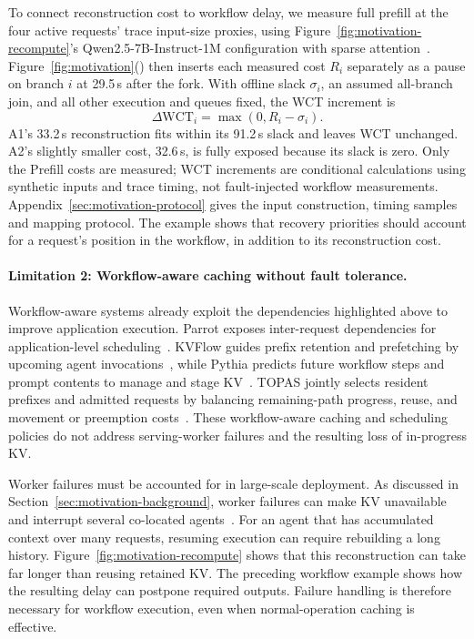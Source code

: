 To connect reconstruction cost to workflow delay, we measure full
prefill at the four active requests' trace input-size proxies, using
Figure~\ref{fig:motivation-recompute}'s Qwen2.5-7B-Instruct-1M
configuration with sparse attention~\cite{qwen2025qwen25oneM,jiang2024minference}.
Figure~\ref{fig:motivation}()
then inserts each measured cost $R_i$ separately as a pause on branch
$i$ at 29.5\,s after the fork. With offline slack $\sigma_i$, an assumed
all-branch join, and all other execution and queues fixed, the WCT
increment is
\[
  \Delta\mathrm{WCT}_i=\max(0,R_i-\sigma_i).
\]
A1's 33.2\,s reconstruction fits within its 91.2\,s slack and leaves WCT
unchanged. A2's slightly smaller cost, 32.6\,s, is fully exposed because
its slack is zero.
Only the Prefill costs are measured; WCT increments are conditional
calculations using synthetic inputs and trace timing, not fault-injected
workflow measurements. Appendix~\ref{sec:motivation-protocol} gives the
input construction, timing samples and mapping protocol.
The example shows that recovery priorities should account for a request's
position in the workflow, in addition to its reconstruction cost.

\paragraph{Limitation 2: Workflow-aware caching without fault tolerance.}
Workflow-aware systems already exploit the dependencies highlighted
above to improve application execution. Parrot exposes inter-request
dependencies for application-level
scheduling~\cite{lin2024parrot}. KVFlow guides prefix retention and
prefetching by upcoming agent invocations~\cite{pan2025kvflow}, while Pythia
predicts future workflow steps and prompt contents to manage and stage
KV~\cite{yu2026pythia}. TOPAS jointly selects resident prefixes and admitted
requests by balancing remaining-path progress, reuse, and movement or
preemption costs~\cite{ni2026topas}. These workflow-aware caching and
scheduling policies do not address serving-worker failures and the
resulting loss of in-progress KV.

Worker failures must be accounted for in large-scale deployment.
As discussed in Section~\ref{sec:motivation-background}, worker failures
can make KV unavailable and interrupt several co-located
agents~\cite{strati2024dejavu,jayakody2026ghostserve,cao2026lumen}.
For an agent that has accumulated context over many requests, resuming
execution can require rebuilding a long history.
Figure~\ref{fig:motivation-recompute} shows that this reconstruction can
take far longer than reusing retained KV. The preceding workflow example
shows how the resulting delay can postpone required outputs.
Failure handling is therefore necessary for workflow execution,
even when normal-operation caching is effective.


